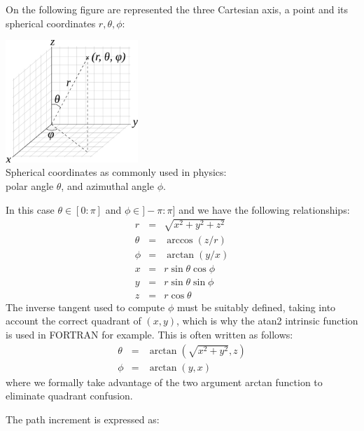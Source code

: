 On the following figure are represented the three Cartesian axis, 
a point and its spherical coordinates $r,\theta,\phi$:
\begin{center}
\includegraphics[width=5cm]{images/sphcoord}\\
{\captionfont Spherical coordinates as commonly used in physics:\\ polar angle $\theta$, and azimuthal angle $\phi$.} 
\end{center}
In this case $\theta\in[0:\pi]$ and $\phi\in]-\pi:\pi]$ and we have the following relationships:
\begin{eqnarray}
r &=& \sqrt{x^2+y^2+z^2} \\
\theta &=& \arccos (z/r) \\
\phi &=& \arctan (y/x) \\
x &=& r \sin \theta \cos \phi \\
y &=& r \sin\theta \sin\phi \\
z &=& r \cos\theta 
\end{eqnarray}
The inverse tangent used to compute $\phi$ must be suitably defined, 
taking into account the correct quadrant of $(x,y)$,
which is why the atan2 intrinsic function is used in \textsc{FORTRAN} for example.    
This is often written as follows:
\begin{eqnarray}
\theta &=& \arctan \left(\sqrt{x^2+y^2},z\right) \\
\phi &=& \arctan (y,x) 
\end{eqnarray}
where we formally take advantage of the two argument arctan
function to eliminate quadrant confusion.

The path increment is expressed as:

